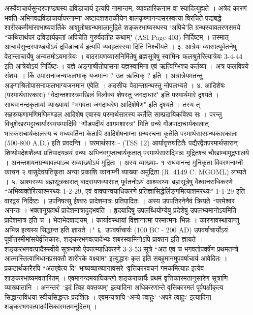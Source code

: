 अस्यैवाचार्यसुन्दरपाण्ड्यस्य द्रविडाचार्य इत्यपि नामान्तम्, व्यावहारिकनाम वा स्यादित्यूह्यते । अत्रेदं कारणं भवति-अभिनवद्रविडाचार्यापरनाम्ना अष्टादशशतकीयेन बालकृष्णानन्दसरस्वत्या विरचिते पद्यबद्धे शारीरकमीमांसाभाष्यवार्तिके आशुतोषग्रन्थमालामुद्रिते शङ्करभाष्यस्थस्य `अपिचे'ति ग्रन्थस्यावतरणसमये ``कथितार्थपरं द्रविडार्यकृतां अपिचेति गुरुर्वदतीह कथाम्" (ASI Page 403) निर्दिष्टम् । तस्मात् आचार्यसुन्दरपाण्ड्योऽयं द्रविडाचार्य इत्यपि व्यवहृतस्स्या दिति निश्चीयते ।
३. आत्रेयः
व्यासात्पूर्वतनेषु वेदान्ताचार्येषु अन्यतमोऽयमात्रेयः । बादरायणव्यासनिमिंतेषु ब्रह्मसूत्रेषु स्वामिनः फलश्रुतेरित्यात्रेयः 3-4-44 इति आत्रेयोऽयं निर्दिष्टः । यज्ञे अङ्गाश्रीतोपासना यज्ञस्वामिना एवं ऋत्विग्भिश्च कर्तव्या । अत्र फलविषये संशयः । किं उपासनाजन्यफलभाक् यजमानः ? उत ऋत्विक् ? इति । अत्रात्रेयमतन्तु अङ्गाश्रितोपासनाफलभाग्यजनमान एवेति । अदसीयः वेदान्तग्रन्थस्तु नोपलभ्यते ।
४. आदिशेषः (परमार्थसारकारः)
``वेदान्तशास्त्रमखिलं विलोक्य शेषस्तु जगदाधार" इति परमार्थमारे दृश्यते । साघवानन्दकृतायां व्याख्यायां ``भगवता जगदाधरेण आदिशेषेण" इति दृश्यते । तस्य त् सहस्रफणामणिमणिमण्डल आदिशेष एवास्य परमार्थसारस्य कर्तेति साम्प्रदायिकविश्व सः । परन्तु विधुशेखरभट्टाचार्यास्स्वपम्पादिवि ``गौडपदीयं आगमशास्त्र" मिति ग्रन्थे गौडपादाचार्यकालात् भास्कराचार्यकालस्य च मध्यवर्तिना केतापि आदिशेषनाम्ना ग्रन्थरचना कृतेति परमार्थसारग्रन्थकारकालः (500-800 A.D.) इति प्रवदन्ति ।
परमार्थसारः - (TSS 12)
आर्यावृत्तघटितैः पद्यैरद्वैतपरमार्थसारान् शिष्योपदेशशैल्यां प्रतिपादयन्नयं ग्रन्थः अभिनवगुप्ताचार्यकृतात् परमार्थसाराद्भिन्नः मुद्रितश्च चौखाम्बामुद्रणालये । अनन्तशयनग्रन्थावल्याञ्च सव्याख्योऽयं मुद्रितः । अस्य व्याख्याः- १ राघवानन्द मुनिकृता विवरणनाम्नी काचन २ वासुदेवयतिकृता अन्या प्रकाशि कानाम्नी व्याख्या अमुद्रिता (R. 4149 C. MGOML) लभ्यते ।
५. आश्मरथ्यः
ब्रह्मसूत्रकारात् बादरायणव्यासात् पूर्वतनोऽयं आश्मरथ्यः ब्रह्मसूत्रेषु वैश्वानराधिकरणे ``अभिव्यक्तेरित्याश्मरथ्यः 1-2-29, एवं वाक्यान्वयाधिकरणे प्रतिज्ञासिद्धेर्लिङ्गमित्याशमरथ्यः" 1-1-29 इति वारद्वयं निर्दिष्टः ।
उपनिषत्सु ईश्वरः प्रादेशमात्रः प्रतिपादितः । अस्य उपपतिरनेनैवं क्रियते ``परमेश्वर अनन्तः । भक्तानुग्रहार्थं प्रादेशमात्रादुद्भवति । हृदयादिषु उपलब्धियोग्येषु प्रदेशेषु उपलभ्यमानोऽयमिति प्रादेशमात्र इति च । भेदाभेदवाद्ययम् । कार्यावस्थायां विज्ञानात्मा परमात्मनः भिन्नः । कारणावस्थायान्तु अभिन्न इत्यस्य सिद्धान्त इति ज्ञायते ।"
६. उपवर्षाचार्यः (100 BC - 200 AD)
उपवर्षाचार्योऽयं पूर्वोत्तरमीमांसयेर्वृत्तिकारः, शङ्करभगवत्पादेभ्यः शबरस्वामिनोऽपि प्राक्तन इति ज्ञायते । शङ्करभगवत्पादैस्स्वीये सूत्रभाष्ये ऐकात्म्याधिकरणे 3-3-53 सूत्रे ``अत एव च भगवतोपवर्षेण प्रथमतन्त्रे आत्मास्तित्वाभिधानप्रसक्तौ शारीरके वक्ष्याम" इत्युद्धारः कृत इति सबहुमानमुपवर्षाचार्य आवेदितः । प्रकटार्थकारैरपि ``अतएवेत्य दि" भाष्यव्याख्यानावसरे `वृत्तिकारवचनं गमकमित्याह इत्येव शाङ्करभाष्यमवतारितम् । एवमानन्दमयाघिकरणे शङ्कराचार्यैः प्रथमं वृत्तिकारमतानुसारेण सूत्राणि व्याख्यातानि । अनन्तरं' `इदं त्विह वक्तव्यम्' इत्यादिना अधिकरणान्ते वृत्तिकारमतं पूर्वपक्षीकृत्य सिद्धान्तविधया स्वीयसिद्धन्तः प्रदर्शितः । एवमन्यत्रापि `अन्ये त्वाहुः' `अपरे त्वाहुः' इत्यादिना शङ्करभगवत्पादर्वत्तिकारमतमनूदितम् ।
